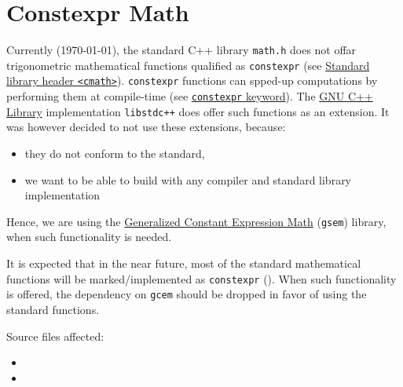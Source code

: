 \section{Constexpr Math}
\label{sec:constexpr-math}
Currently (\today), the standard C++ library \texttt{math.h} does not offar 
trigonometric mathematical functions qualified as \texttt{constexpr} (see 
\href{https://en.cppreference.com/w/cpp/header/cmath}{Standard library header \texttt{<cmath>}}).
\texttt{constexpr} functions can spped-up computations by performing them at 
compile-time (see 
\href{https://en.cppreference.com/w/cpp/language/constexpr}{\texttt{constexpr} keyword}). 
The \href{https://gcc.gnu.org/onlinedocs/libstdc++/}{GNU C++ Library} 
implementation \texttt{libstdc++} does offer such functions as an extension. It 
was however decided to not use these extensions, because:
\begin{itemize}
    \item they do not conform to the standard,
    \item we want to be able to build with any compiler and standard library implementation
\end{itemize}

Hence, we are using the \href{https://www.kthohr.com/gcem.html}{Generalized Constant Expression Math} 
(\texttt{gsem}) library, when such functionality is needed.

It is expected that in the near future, most of the standard mathematical 
functions will be marked/implemented as \texttt{constexpr} (\cite{rostencpp}). 
When such functionality is offered, the dependency on \texttt{gcem} should be 
dropped in favor of using the standard functions.

Source files affected:
\begin{itemize}
    \item {}
    \item {}
\end{itemize}
